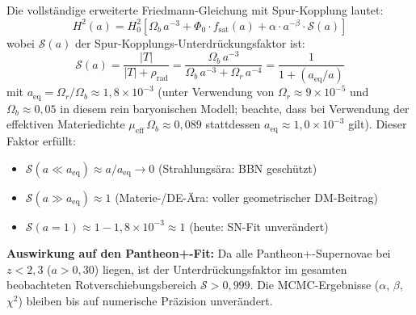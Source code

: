 \documentclass[aps,prd,twocolumn,superscriptaddress,nofootinbib,floatfix]{revtex4-2}
\begin{document}
Die vollständige erweiterte Friedmann-Gleichung mit Spur-Kopplung lautet:
\begin{equation}
{H^2(a) = H_0^2 \left[\Omega_b\,a^{-3} + \Phi_0 \cdot f_{\mathrm{sat}}(a) + \alpha \cdot a^{-\beta} \cdot \mathcal{S}(a)\right]}
\label{eq:extended_cfm_trace}
\end{equation}
wobei $\mathcal{S}(a)$ der Spur-Kopplungs-Unterdrückungsfaktor ist:
\begin{equation}
\mathcal{S}(a) = \frac{|T|}{|T| + \rho_{\mathrm{rad}}} = \frac{\Omega_b\,a^{-3}}{\Omega_b\,a^{-3} + \Omega_r\,a^{-4}}
= \frac{1}{1 + (a_{\mathrm{eq}}/a)}
\label{eq:suppression}
\end{equation}
mit $a_{\mathrm{eq}} = \Omega_r/\Omega_b \approx 1{,}8 \times 10^{-3}$ (unter Verwendung von $\Omega_r \approx 9 \times 10^{-5}$ und $\Omega_b \approx 0{,}05$ in diesem rein baryonischen Modell; beachte, dass bei Verwendung der effektiven Materiedichte $\mu_{\mathrm{eff}}\,\Omega_b \approx 0{,}089$ stattdessen $a_{\mathrm{eq}} \approx 1{,}0 \times 10^{-3}$ gilt). Dieser Faktor erfüllt:
\begin{itemize}
\item $\mathcal{S}(a \ll a_{\mathrm{eq}}) \approx a/a_{\mathrm{eq}} \to 0$ \quad (Strahlungsära: BBN geschützt)
\item $\mathcal{S}(a \gg a_{\mathrm{eq}}) \approx 1$ \quad (Materie-/DE-Ära: voller geometrischer DM-Beitrag)
\item $\mathcal{S}(a = 1) \approx 1 - 1{,}8\times10^{-3} \approx 1$ \quad (heute: SN-Fit unverändert)
\end{itemize}

\textbf{Auswirkung auf den Pantheon+-Fit:} Da alle Pantheon+-Supernovae bei $z < 2{,}3$ ($a > 0{,}30$) liegen, ist der Unterdrückungsfaktor im gesamten beobachteten Rotverschiebungsbereich $\mathcal{S} > 0{,}999$. Die MCMC-Ergebnisse ($\alpha$, $\beta$, $\chi^2$) bleiben bis auf numerische Präzision unverändert.
\end{document}

